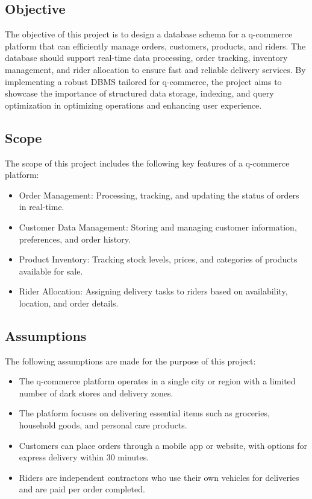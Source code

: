 \noindent
\subsection{Objective}
The objective of this project is to design a database schema for a q-commerce platform that can efficiently manage orders, customers, products, and riders. The database should support real-time data processing, order tracking, inventory management, and rider allocation to ensure fast and reliable delivery services. By implementing a robust DBMS tailored for q-commerce, the project aims to showcase the importance of structured data storage, indexing, and query optimization in optimizing operations and enhancing user experience.

\subsection{Scope}
The scope of this project includes the following key features of a q-commerce platform:
\begin{itemize}
    \item Order Management: Processing, tracking, and updating the status of orders in real-time.
    \item Customer Data Management: Storing and managing customer information, preferences, and order history.
    \item Product Inventory: Tracking stock levels, prices, and categories of products available for sale.
    \item Rider Allocation: Assigning delivery tasks to riders based on availability, location, and order details.
\end{itemize}

\subsection{Assumptions}
The following assumptions are made for the purpose of this project:
\begin{itemize}
    \item The q-commerce platform operates in a single city or region with a limited number of dark stores and delivery zones.
    \item The platform focuses on delivering essential items such as groceries, household goods, and personal care products.
    \item Customers can place orders through a mobile app or website, with options for express delivery within 30 minutes.
    \item Riders are independent contractors who use their own vehicles for deliveries and are paid per order completed.
\end{itemize}

